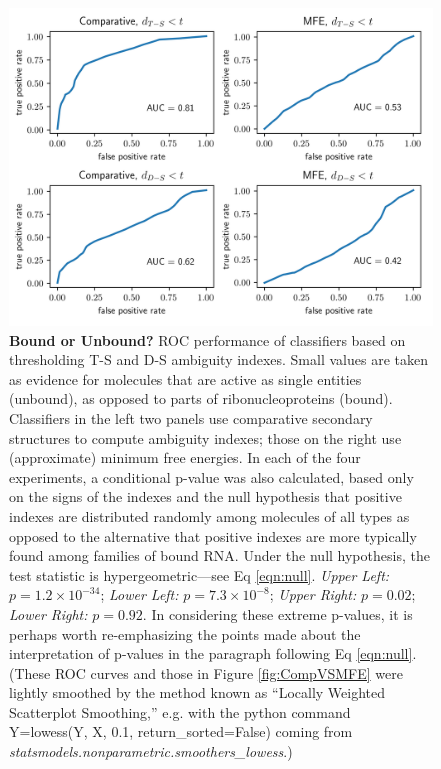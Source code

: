 \begin{figure}[h!]
\centering
\includegraphics[width=\textwidth]{bound_unbound.png}
\vglue 0.5cm

\caption{{\bf Bound or Unbound?} ROC performance of classifiers based on thresholding T-S
and D-S ambiguity indexes. Small values are taken as evidence for molecules that are active as
single entities (unbound), as opposed to parts of ribonucleoproteins (bound). Classifiers in the
left two panels use comparative secondary structures to compute ambiguity indexes; those on the
right use (approximate) minimum free energies. In each of the four experiments, a conditional
p-value was also calculated, based only on the signs of the indexes and the null hypothesis that
positive indexes are distributed randomly among molecules of all types as opposed to the alternative
that positive indexes are more typically found among families of bound RNA. Under the null hypothesis,
the test statistic is hypergeometric---see Eq \ref{eqn:null}. {\em Upper Left:} $p= 1.2 \times 10^{-34} $;
{\em Lower Left:} $p=7.3 \times 10^{-8}$; {\em Upper Right:} $p=0.02$;  {\em Lower Right:} $p=0.92$.
In considering these extreme p-values, it is perhaps worth re-emphasizing the points made about the
interpretation of p-values in the paragraph following Eq \ref{eqn:null}. (These ROC curves and
those in Figure \ref{fig:CompVSMFE} were lightly smoothed by the method known as
``Locally Weighted Scatterplot Smoothing,'' e.g. with the python command Y=lowess(Y, X, 0.1, return\_sorted=False)
coming from \textit{statsmodels.nonparametric.smoothers\_lowess}.)
}
\label{fig:UnboundVSBound}
\end{figure}
